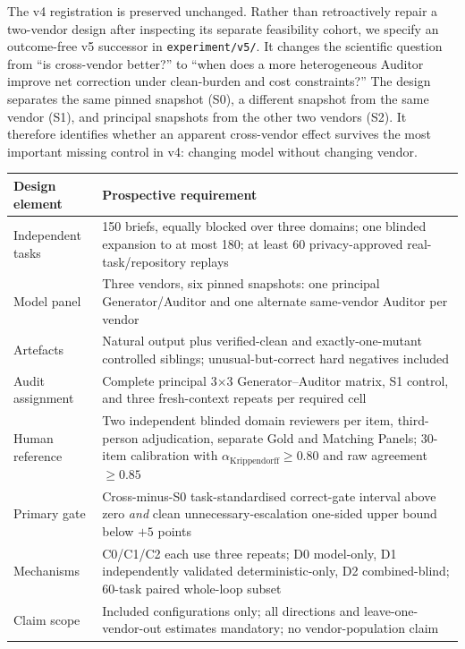 \documentclass[11pt,letterpaper]{article}
\begin{document}
The v4 registration is preserved unchanged. Rather than retroactively repair a two-vendor design after inspecting its separate feasibility cohort, we specify an outcome-free v5 successor in \texttt{experiment/v5/}. It changes the scientific question from ``is cross-vendor better?'' to ``when does a more heterogeneous Auditor improve net correction under clean-burden and cost constraints?'' The design separates the same pinned snapshot (S0), a different snapshot from the same vendor (S1), and principal snapshots from the other two vendors (S2). It therefore identifies whether an apparent cross-vendor effect survives the most important missing control in v4: changing model without changing vendor.

\begin{center}
\footnotesize\setlength{\tabcolsep}{3pt}\renewcommand{\arraystretch}{0.96}
\label{tab:v5design}
\begin{tabular}{@{}p{37mm}p{105mm}@{}}
\toprule
Design element & Prospective requirement \\
\midrule
Independent tasks & 150 briefs, equally blocked over three domains; one blinded expansion to at most 180; at least 60 privacy-approved real-task/repository replays \\
Model panel & Three vendors, six pinned snapshots: one principal Generator/Auditor and one alternate same-vendor Auditor per vendor \\
Artefacts & Natural output plus verified-clean and exactly-one-mutant controlled siblings; unusual-but-correct hard negatives included \\
Audit assignment & Complete principal 3$\times$3 Generator--Auditor matrix, S1 control, and three fresh-context repeats per required cell \\
Human reference & Two independent blinded domain reviewers per item, third-person adjudication, separate Gold and Matching Panels; 30-item calibration with $\alpha_{\mathrm{Krippendorff}}\geq0.80$ and raw agreement $\geq0.85$ \\
Primary gate & Cross-minus-S0 task-standardised correct-gate interval above zero \emph{and} clean unnecessary-escalation one-sided upper bound below $+5$ points \\
Mechanisms & C0/C1/C2 each use three repeats; D0 model-only, D1 independently validated deterministic-only, D2 combined-blind; 60-task paired whole-loop subset \\
Claim scope & Included configurations only; all directions and leave-one-vendor-out estimates mandatory; no vendor-population claim \\
\bottomrule
\end{tabular}
\end{center}
\end{document}
